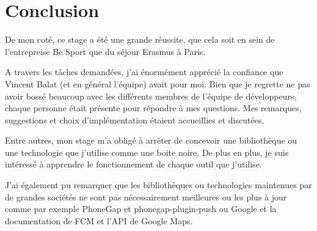 \section{Conclusion}

De mon coté, ce stage a été une grande réussite, que cela soit en sein de
l'entrepreise Be Sport que du séjour Erasmus à Paris.

A travers les tâches demandées, j'ai énormément apprécié la confiance que
Vincent Balat (et en général l'équipe) avait pour moi.
Bien que je regrette ne pas avoir bossé beaucoup avec les différents membres de
l'équipe de développeurs, chaque personne était présente pour répondre à mes
questions. Mes remarques, suggestions et choix d'implémentation étaient
accueillies et discutées.

Entre autres, mon stage m'a obligé à arrêter de concevoir une bibliothèque ou
une technologie que j'utilise comme une boite noire. De plus en plus, je suis
intéressé à apprendre le fonctionnement de chaque outil que j'utilise.

J'ai également pu remarquer que les bibliothèques ou technologies maintenues par de grandes
sociétés ne sont pas nécessairement meilleures ou les plus à jour comme par
exemple PhoneGap et phonegap-plugin-push ou Google et la documentation de FCM et
l'API de Google Maps.